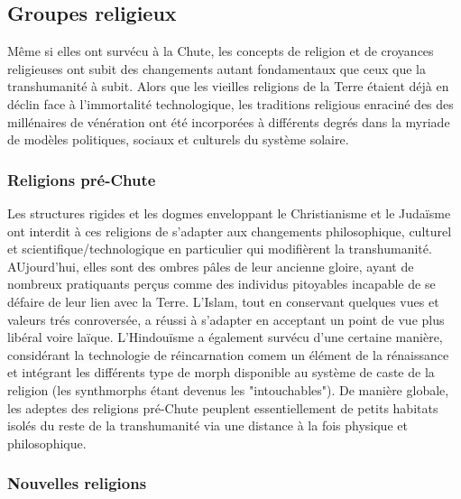                                              \subsection{Groupes religieux} \label{sec:religious-groups} 

                                             Même si elles ont survécu à la Chute, les concepts de religion et de croyances religieuses ont subit des changements autant fondamentaux que ceux que la transhumanité à subit. Alors que les vieilles religions de la Terre étaient déjà en déclin face à l'immortalité technologique, les traditions religious enraciné des des millénaires de vénération ont été incorporées à différents degrés dans la myriade de modèles politiques, sociaux et culturels du système solaire. 

                                             \subsubsection{Religions pré-Chute} \label{sec:pre-fall-religions} 

                                             Les structures rigides et les dogmes enveloppant le Christianisme et le Judaïsme ont interdit à ces religions de s'adapter aux changements philosophique, culturel et scientifique/technologique en particulier qui modifièrent la transhumanité. AUjourd'hui, elles sont des ombres pâles de leur ancienne gloire, ayant de nombreux pratiquants perçus comme des individus pitoyables incapable de se défaire de leur lien avec la Terre. L'Islam, tout en conservant quelques vues et valeurs trés conroversée, a réussi à s'adapter en acceptant un point de vue plus libéral voire laïque. L'Hindouïsme a également survécu d'une certaine manière, considérant la technologie de réincarnation comem un élément de la rénaissance et intégrant les différents type de morph disponible au système de caste de la religion (les synthmorphs étant devenus les "intouchables"). De manière globale, les adeptes des religions pré-Chute peuplent essentiellement de petits habitats isolés du reste de la transhumanité via une distance à la fois physique et philosophique. 

                                             \subsubsection{Nouvelles religions} \label{sec:new-religions} 

